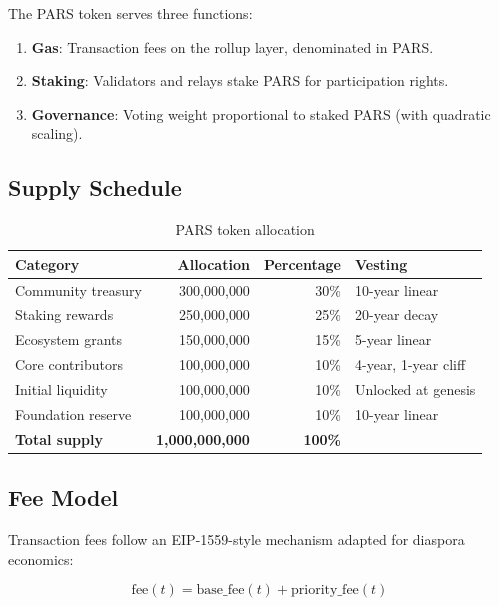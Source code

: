 \documentclass[11pt,a4paper]{article}
\begin{document}
The PARS token serves three functions:

\begin{enumerate}
    \item \textbf{Gas}: Transaction fees on the rollup layer, denominated in PARS.
    \item \textbf{Staking}: Validators and relays stake PARS for participation rights.
    \item \textbf{Governance}: Voting weight proportional to staked PARS (with quadratic scaling).
\end{enumerate}

\subsection{Supply Schedule}

\begin{table}[H]
\centering
\caption{PARS token allocation}
\label{tab:allocation}
\begin{tabular}{lrrl}
\toprule
\textbf{Category} & \textbf{Allocation} & \textbf{Percentage} & \textbf{Vesting} \\
\midrule
Community treasury & 300{,}000{,}000 & 30\% & 10-year linear \\
Staking rewards & 250{,}000{,}000 & 25\% & 20-year decay \\
Ecosystem grants & 150{,}000{,}000 & 15\% & 5-year linear \\
Core contributors & 100{,}000{,}000 & 10\% & 4-year, 1-year cliff \\
Initial liquidity & 100{,}000{,}000 & 10\% & Unlocked at genesis \\
Foundation reserve & 100{,}000{,}000 & 10\% & 10-year linear \\
\midrule
\textbf{Total supply} & \textbf{1{,}000{,}000{,}000} & \textbf{100\%} & \\
\bottomrule
\end{tabular}
\end{table}

\subsection{Fee Model}

Transaction fees follow an EIP-1559-style mechanism adapted for diaspora economics:

\begin{equation}
\text{fee}(t) = \text{base\_fee}(t) + \text{priority\_fee}(t)
\end{equation}
\end{document}
